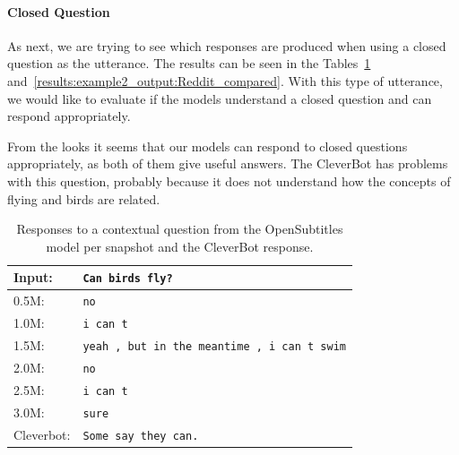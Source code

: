 \paragraph{Closed Question} As next, we are trying to see which responses are produced when using a closed question as the utterance. The results can be seen in the Tables~\ref{results:example2_output:OpenSubtitle_compared} and~\ref{results:example2_output:Reddit_compared}. With this type of utterance, we would like to evaluate if the models understand a closed question and can respond appropriately.

From the looks it seems that our models can respond to closed questions appropriately, as both of them give useful answers. The CleverBot has problems with this question, probably because it does not understand how the concepts of flying and birds are related.
\\
\begin{table}[H]
	\centering
	\begin{adjustbox}{max width=\textwidth}
		\begin{tabular}{ll}
			\toprule
			Input: 	& \texttt{Can birds fly?}\\
			\midrule
			0.5M: 	& \texttt{no}\\
			1.0M: 	& \texttt{i can t}\\
			1.5M:	& \texttt{yeah , but in the meantime , i can t swim}\\
			2.0M:	& \texttt{no}\\
			2.5M:	& \texttt{i can t}\\
			3.0M:	& \texttt{sure}\\
			Cleverbot:	& \texttt{Some say they can.}\\
			\bottomrule
		\end{tabular}
	\end{adjustbox}
	\caption{Responses to a contextual question from the OpenSubtitles model per snapshot and the CleverBot response.}
	\label{results:example2_output:OpenSubtitle_compared}
\end{table}
